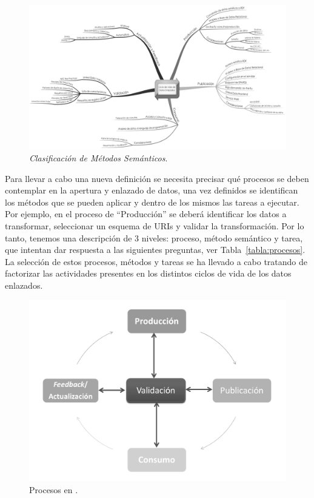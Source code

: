 \begin{figure}[!htb]
\centering
	\includegraphics[width=16cm]{images/phd/ldl}
\caption{\textit{Clasificación de Métodos Semánticos}.}
\label{fig:metodos-clasificacion}
\end{figure}

Para llevar a cabo una nueva definición se necesita precisar qué procesos se deben contemplar en la apertura y enlazado
de datos, una vez definidos se identifican los métodos que se pueden aplicar y dentro de los mismos las tareas a ejecutar. 
Por ejemplo, en el proceso de ``Producción'' se deberá identificar los datos a transformar, seleccionar un esquema de URIs y validar la transformación. 
Por lo tanto, tenemos una descripción de 3 niveles: proceso, método semántico y tarea, que intentan dar respuesta a las siguientes preguntas, ver Tabla~\ref{tabla:procesos}. La selección
de estos procesos, métodos y tareas se ha llevado a cabo tratando de factorizar las actividades presentes en los distintos ciclos de vida de los datos enlazados.

\begin{figure}[!htb]
\centering
	\includegraphics[width=14cm]{images/phd/lld}
\caption{Procesos en \linkeddata.}
\label{fig:metodos-clasificacion}
\end{figure}


